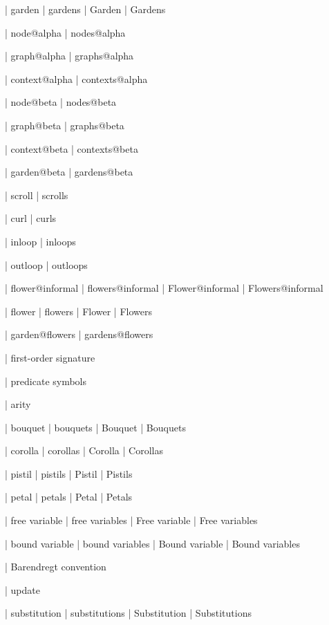  | garden
 | gardens
 | Garden
 | Gardens

 | node@alpha
 | nodes@alpha

 | graph@alpha
 | graphs@alpha

 | context@alpha
 | contexts@alpha

 | node@beta
 | nodes@beta

 | graph@beta
 | graphs@beta

 | context@beta
 | contexts@beta

 | garden@beta
 | gardens@beta


 | scroll
 | scrolls

 | curl
 | curls

 | inloop
 | inloops

 | outloop
 | outloops

 | flower@informal
 | flowers@informal
 | Flower@informal
 | Flowers@informal

 | flower
 | flowers
 | Flower
 | Flowers

 | garden@flowers
 | gardens@flowers

 | first-order signature

 | predicate symbols

 | arity

 | bouquet
 | bouquets
 | Bouquet
 | Bouquets

 | corolla
 | corollas
 | Corolla
 | Corollas

 | pistil
 | pistils
 | Pistil
 | Pistils

 | petal
 | petals
 | Petal
 | Petals

 | free variable
 | free variables
 | Free variable
 | Free variables

 | bound variable
 | bound variables
 | Bound variable
 | Bound variables

 | Barendregt convention

 | update

 | substitution
 | substitutions
 | Substitution
 | Substitutions

